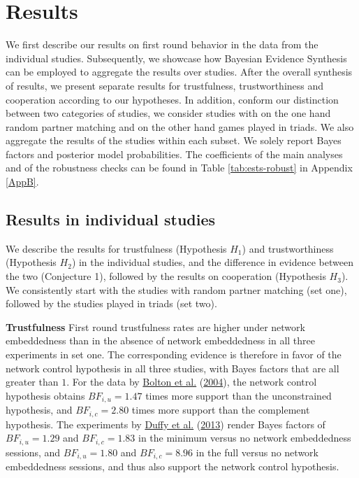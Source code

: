 \documentclass[
  11pt,
]{article}
\begin{document}
\hypertarget{results}{%
\section{Results}\label{results}}

We first describe our results on first round behavior in the data from the individual studies.
Subsequently, we showcase how Bayesian Evidence Synthesis can be employed to aggregate the results over studies.
After the overall synthesis of results, we present separate results for trustfulness, trustworthiness and cooperation according to our hypotheses.
In addition, conform our distinction between two categories of studies, we consider studies with on the one hand random partner matching and on the other hand games played in triads.
We also aggregate the results of the studies within each subset.
We solely report Bayes factors and posterior model probabilities. The coefficients of the main analyses and of the robustness checks can be found in Table \ref{tab:ests-robust} in Appendix \ref{AppB}.

\hypertarget{results-in-individual-studies}{%
\subsection{Results in individual studies}\label{results-in-individual-studies}}

We describe the results for trustfulness (Hypothesis \(H_1\)) and trustworthiness (Hypothesis \(H_2\)) in the individual studies, and the difference in evidence between the two (Conjecture 1), followed by the results on cooperation (Hypothesis \(H_3\)).
We consistently start with the studies with random partner matching (set one), followed by the studies played in triads (set two).

\textbf{Trustfulness} \hspace{8pt} First round trustfulness rates are higher under network embeddedness than in the absence of network embeddedness in all three experiments in set one.
The corresponding evidence is therefore in favor of the network control hypothesis in all three studies, with Bayes factors that are all greater than \(1\).
For the data by \protect\hyperlink{ref-bolton_electronic_2004}{Bolton et al.} (\protect\hyperlink{ref-bolton_electronic_2004}{2004}), the network control hypothesis obtains \(BF_{i,u} = 1.47\) times more support than the unconstrained hypothesis, and \(BF_{i,c} = 2.80\) times more support than the complement hypothesis.
The experiments by \protect\hyperlink{ref-duffy2013social}{Duffy et al.} (\protect\hyperlink{ref-duffy2013social}{2013}) render Bayes factors of \(BF_{i,u} = 1.29\) and \(BF_{i,c} = 1.83\) in the minimum versus no network embeddedness sessions, and \(BF_{i,u} = 1.80\) and \(BF_{i,c} = 8.96\) in the full versus no network embeddedness sessions, and thus also support the network control hypothesis.
\end{document}
